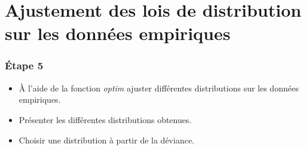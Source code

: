 \section{Ajustement des lois de distribution sur les données empiriques}
\begin{frame}[fragile=singleslide]
  \frametitle{Étape 5}

\begin{itemize}
\item À l'aide de la fonction \textit{optim} ajuster différentes distributions sur les données empiriques.
\item Présenter les différentes distributions obtenues.
\item Choisir une distribution à partir de la déviance.
\end{itemize}
\end{frame}

